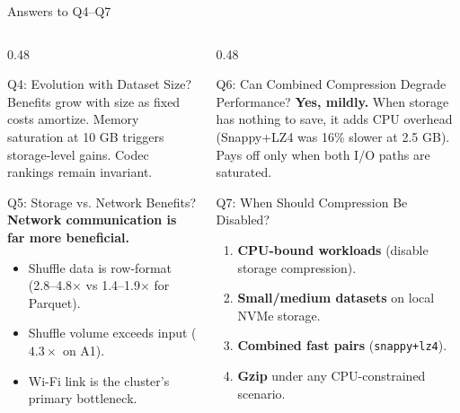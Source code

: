 \documentclass[aspectratio=169, 10pt]{beamer}
\begin{document}
\begin{frame}{Answers to Q4--Q7}
  \begin{columns}[T]
    \begin{column}{0.48\textwidth}
      \begin{block}{\footnotesize Q4: Evolution with Dataset Size?}
        \scriptsize
        Benefits grow with size as fixed costs amortize. Memory saturation at 10 GB triggers storage-level gains. Codec rankings remain invariant.
      \end{block}

      \begin{block}{\footnotesize Q5: Storage vs. Network Benefits?}
        \scriptsize
        \textbf{Network communication is far more beneficial.}
        \begin{itemize}
          \scriptsize
          \item Shuffle data is row-format (2.8--4.8$\times$ vs 1.4--1.9$\times$ for Parquet).
          \item Shuffle volume exceeds input ($4.3\times$ on A1).
          \item Wi-Fi link is the cluster's primary bottleneck.
        \end{itemize}
      \end{block}
    \end{column}

    \begin{column}{0.48\textwidth}
      \begin{block}{\footnotesize Q6: Can Combined Compression Degrade Performance?}
        \scriptsize
        \textbf{Yes, mildly.} When storage has nothing to save, it adds CPU overhead (Snappy+LZ4 was 16\% slower at 2.5 GB). Pays off only when both I/O paths are saturated.
      \end{block}

      \begin{alertblock}{\footnotesize Q7: When Should Compression Be Disabled?}
        \scriptsize
        \begin{enumerate}
          \scriptsize
          \item \textbf{CPU-bound workloads} (disable storage compression).
          \item \textbf{Small/medium datasets} on local NVMe storage.
          \item \textbf{Combined fast pairs} (\texttt{snappy+lz4}).
          \item \textbf{Gzip} under any CPU-constrained scenario.
        \end{enumerate}
      \end{alertblock}
    \end{column}
  \end{columns}
\end{frame}
\end{document}
